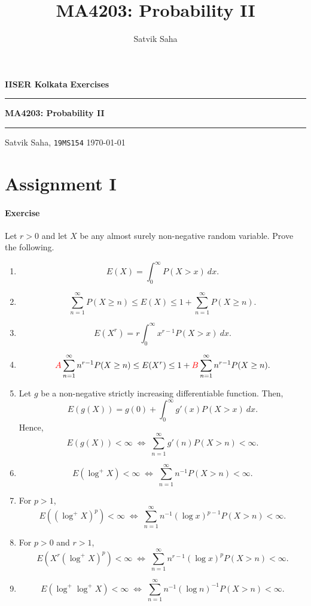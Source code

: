 \documentclass[10pt]{article}
\title{MA4203: Probability II}
\author{Satvik Saha}
\date{}
\newcounter{prob}
\newcommand{\problem}{\stepcounter{prob}\paragraph{Exercise \arabic{prob}}}
\begin{document}
    \noindent\textbf{IISER Kolkata} \hfill \textbf{Exercises}
    \vspace{3pt}
    \hrule
    \vspace{3pt}
    \begin{center}
    \LARGE{\textbf{MA4203: Probability II}}
    \end{center}
    \vspace{3pt}
    \hrule
    \vspace{3pt}
    Satvik Saha, \texttt{19MS154} \hfill \today
    \vspace{20pt}


    \section*{Assignment I}


    \problem Let $r > 0$ and let $X$ be any almost surely non-negative random
    variable. Prove the following. \begin{enumerate}
        \item $$ E(X) = \int_0^\infty P(X > x) \:dx. $$
        \item $$ \sum_{n = 1}^\infty P(X \geq n) \leq E(X) \leq 1 + \sum_{n = 1}^\infty
        P(X \geq n). $$
        \item $$ E(X^r) = r \int_0^\infty x^{r - 1} P(X > x) \:dx. $$
        \item $$ \textcolor{red}{A}\sum_{n = 1}^\infty n^{r - 1}P(X \geq n) \leq
        E(X^r) \leq 1 + \textcolor{red}{B}\sum_{n = 1}^\infty n^{r - 1} P(X \geq n). $$
        \item Let $g$ be a non-negative strictly increasing differentiable function.
        Then, \[
            E(g(X)) = g(0) + \int_0^\infty g'(x) P(X > x) \:dx.
        \] Hence, \[
            E(g(X)) < \infty \;\iff\; \sum_{n = 1}^\infty g'(n) P(X > n) < \infty.
        \]

        \item $$ E(\log^+{X}) < \infty \;\iff\; \sum_{n = 1}^\infty n^{-1} P(X > n)
        < \infty. $$

        \item For $p > 1$, $$ E((\log^+{X})^p) < \infty \;\iff\; \sum_{n = 1}^\infty
        n^{-1} (\log{x})^{p - 1} P(X > n) < \infty. $$

        \item For $p > 0$ and $r > 1$, $$ E(X^r(\log^+{X})^p) < \infty \;\iff\;
        \sum_{n = 1}^\infty n^{r - 1} (\log{x})^p P(X > n) < \infty. $$

        \item $$ E(\log^+\log^+{X}) < \infty \;\iff\; \sum_{n = 1}^\infty n^{-1}
        (\log{n})^{-1} P(X > n) < \infty. $$
    \end{enumerate}
\end{document}

